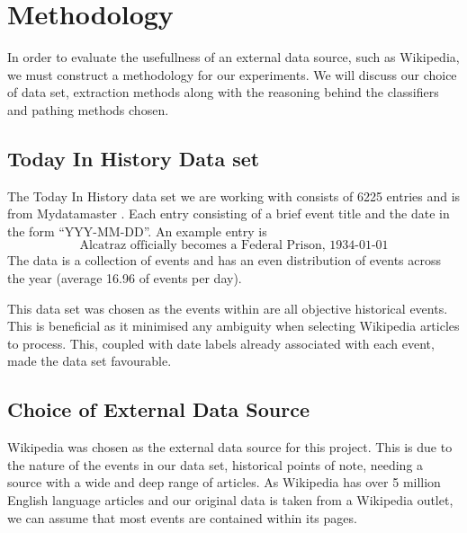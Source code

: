 \documentclass[bsc,frontabs,twoside,singlespacing,parskip,deptreport]{infthesis}     %
\begin{document}
\chapter{Methodology}
In order to evaluate the usefullness of an external data source, such as Wikipedia, we must construct a methodology
for our experiments. We will discuss our choice of data set, extraction methods along with the reasoning behind the
classifiers and pathing methods chosen.


\section{Today In History Data set}
The Today In History data set we are working with consists of 6225 entries and is from Mydatamaster \cite{mydatamaster}.
Each entry consisting of a  brief event title and the date in the form ``YYY-MM-DD''.
An example entry is
\begin{equation}
  \text{Alcatraz officially becomes a Federal Prison, 1934-01-01}\nonumber
\end{equation}
The data is a collection of events and has
an even distribution of events across the year (average 16.96 of events per day).

This data set was chosen as the events within are all objective historical events. This is beneficial as it minimised
any ambiguity when selecting Wikipedia articles to process. This, coupled with date labels already associated with
each event, made the data set favourable.


\section{Choice of External Data Source}
Wikipedia was chosen as the external data source for this project.
This is due to the nature of the events in our data set, historical points of note,
needing a source with a wide and deep range of articles.
As Wikipedia has over 5 million English language articles \cite{wikipedaisize} and our original data
is taken from a Wikipedia outlet, we can assume
that most events are contained within its pages.
\end{document}
